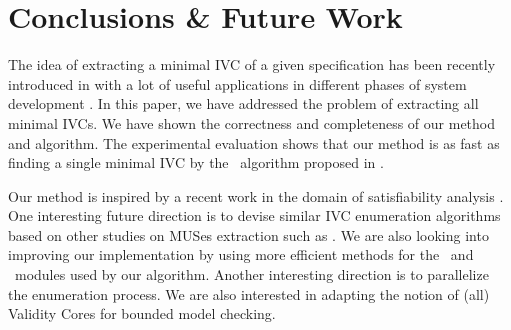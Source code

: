 \section{Conclusions \& Future Work}
\label{sec:conc}
The idea of extracting a minimal IVC of a given 
specification has been recently introduced in \cite{Ghass16} with a lot of useful applications in different phases of system development \cite{Ghass16, Murugesan16:renext, Ghass17Cov}.
In this paper, we have addressed the problem of extracting all minimal IVCs. We have shown 
the correctness and completeness of our method and algorithm.
The experimental evaluation shows that our method is as fast as finding a single
 minimal IVC by the \ucbfalg ~algorithm proposed in \cite{Ghass16}. 
 
 Our method is inspired by a recent work in the domain of satisfiability analysis \cite{marco2016fast}. One interesting future direction is to devise similar IVC enumeration algorithms based on other studies on MUSes extraction such as \cite{Bacchus2016, nadel2014accelerated}.
 We are also looking into improving our implementation by using more 
 efficient methods for the \isadeq ~and \getivc ~modules used by our algorithm. 
 Another interesting direction is to parallelize the enumeration process. 
 We are also interested in adapting the notion of (all) Validity Cores for bounded model checking.  
